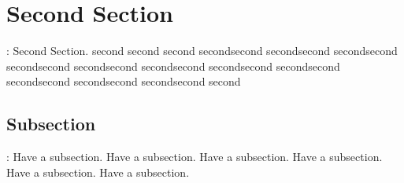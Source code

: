 \documentclass[a4paper,12pt]{article}
\begin{document}
	\section{Second Section}:
	Second Section. second second second secondsecond secondsecond secondsecond secondsecond secondsecond secondsecond secondsecond secondsecond secondsecond secondsecond secondsecond second
	\subsection{Subsection}:
	Have a subsection.	Have a subsection.	Have a subsection.	Have a subsection.	Have a subsection.	Have a subsection.
\end{document}

